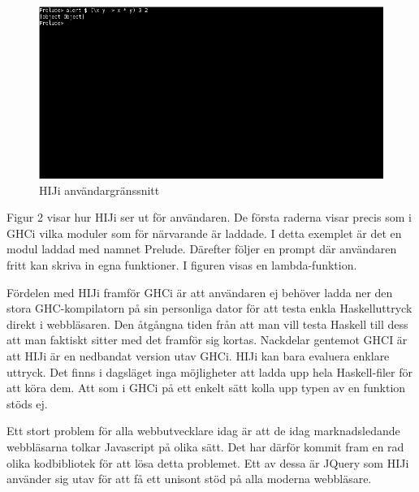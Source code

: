 \begin{figure}[H]
    \begin{center}
        \includegraphics[width=1\textwidth]{hiji_screen3.png}
        \caption{HIJi användargränssnitt}
    \end{center}
\end{figure}

Figur 2 visar hur HIJi ser ut för användaren. De första raderna visar precis som i GHCi vilka moduler som för närvarande är laddade. I detta exemplet är det en modul laddad med namnet Prelude. Därefter följer en prompt där användaren fritt kan skriva in egna funktioner. I figuren visas en lambda-funktion.



Fördelen med HIJi framför GHCi är att användaren ej behöver ladda ner den stora GHC-kompilatorn på sin personliga dator för att testa enkla Haskelluttryck direkt i webbläsaren. Den åtgångna tiden från  att man vill testa Haskell till dess att man faktiskt sitter med det framför sig kortas. 
Nackdelar gentemot GHCI är att HIJi är en nedbandat version utav GHCi. HIJi kan bara evaluera enklare uttryck. Det finns i dagsläget inga möjligheter att ladda upp hela Haskell-filer för att köra dem. Att som i GHCi på ett enkelt sätt kolla upp  typen av en funktion stöds ej.

Ett stort problem för alla webbutvecklare idag är att de idag marknadsledande webbläsarna tolkar Javascript på olika sätt. Det har därför kommit fram en rad olika kodbibliotek för att lösa detta problemet. Ett av dessa är JQuery som HIJi använder sig utav för att få ett unisont stöd på alla moderna webbläsare. 


